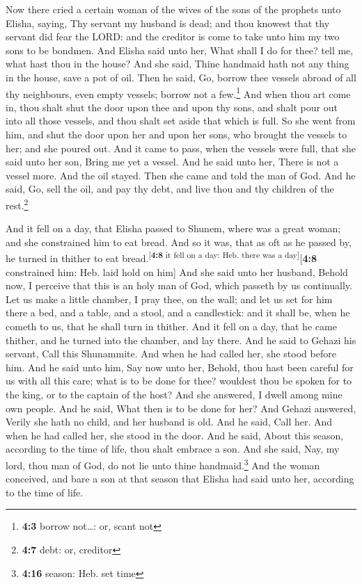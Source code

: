  Now there cried a certain woman of the wives of the sons
of the prophets unto Elisha, saying, Thy servant my husband is dead; and
thou knowest that thy servant did fear the LORD: and the creditor is
come to take unto him my two sons to be bondmen.  And
Elisha said unto her, What shall I do for thee? tell me, what hast thou
in the house? And she said, Thine handmaid hath not any thing in the
house, save a pot of oil.  Then he said, Go, borrow thee
vessels abroad of all thy neighbours, even empty vessels; borrow not a
few.\footnote{\textbf{4:3} borrow not\ldots: or, scant not}
 And when thou art come in, thou shalt shut the door upon
thee and upon thy sons, and shalt pour out into all those vessels, and
thou shalt set aside that which is full.  So she went from
him, and shut the door upon her and upon her sons, who brought the
vessels to her; and she poured out.  And it came to pass,
when the vessels were full, that she said unto her son, Bring me yet a
vessel. And he said unto her, There is not a vessel more. And the oil
stayed.  Then she came and told the man of God. And he
said, Go, sell the oil, and pay thy debt, and live thou and thy children
of the rest.\footnote{\textbf{4:7} debt: or, creditor}

 And it fell on a day, that Elisha passed to Shunem, where
was a great woman; and she constrained him to eat bread. And so it was,
that as oft as he passed by, he turned in thither to eat
bread.\textsuperscript{{[}\textbf{4:8} it fell on a day: Heb. there was
a day{]}}{[}\textbf{4:8} constrained him: Heb. laid hold on him{]}
 And she said unto her husband, Behold now, I perceive
that this is an holy man of God, which passeth by us continually.
 Let us make a little chamber, I pray thee, on the wall;
and let us set for him there a bed, and a table, and a stool, and a
candlestick: and it shall be, when he cometh to us, that he shall turn
in thither.  And it fell on a day, that he came thither,
and he turned into the chamber, and lay there.  And he
said to Gehazi his servant, Call this Shunammite. And when he had called
her, she stood before him.  And he said unto him, Say now
unto her, Behold, thou hast been careful for us with all this care; what
is to be done for thee? wouldest thou be spoken for to the king, or to
the captain of the host? And she answered, I dwell among mine own
people.  And he said, What then is to be done for her?
And Gehazi answered, Verily she hath no child, and her husband is old.
 And he said, Call her. And when he had called her, she
stood in the door.  And he said, About this season,
according to the time of life, thou shalt embrace a son. And she said,
Nay, my lord, thou man of God, do not lie unto thine
handmaid.\footnote{\textbf{4:16} season: Heb. set time} 
And the woman conceived, and bare a son at that season that Elisha had
said unto her, according to the time of life.

